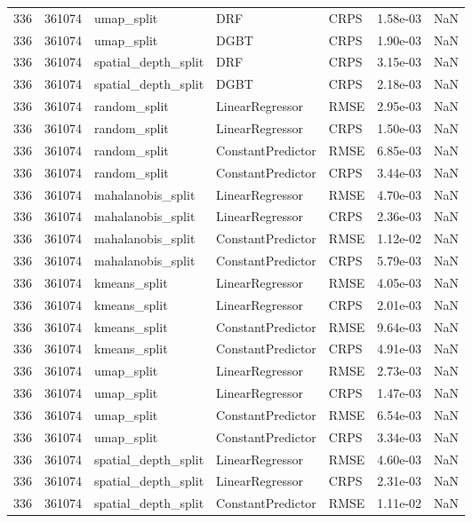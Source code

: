 \begin{tabular}{rrlllrr}
336 & 361074 & umap\_split & DRF & CRPS & 1.58e-03 & NaN \\
336 & 361074 & umap\_split & DGBT & CRPS & 1.90e-03 & NaN \\
336 & 361074 & spatial\_depth\_split & DRF & CRPS & 3.15e-03 & NaN \\
336 & 361074 & spatial\_depth\_split & DGBT & CRPS & 2.18e-03 & NaN \\
336 & 361074 & random\_split & LinearRegressor & RMSE & 2.95e-03 & NaN \\
336 & 361074 & random\_split & LinearRegressor & CRPS & 1.50e-03 & NaN \\
336 & 361074 & random\_split & ConstantPredictor & RMSE & 6.85e-03 & NaN \\
336 & 361074 & random\_split & ConstantPredictor & CRPS & 3.44e-03 & NaN \\
336 & 361074 & mahalanobis\_split & LinearRegressor & RMSE & 4.70e-03 & NaN \\
336 & 361074 & mahalanobis\_split & LinearRegressor & CRPS & 2.36e-03 & NaN \\
336 & 361074 & mahalanobis\_split & ConstantPredictor & RMSE & 1.12e-02 & NaN \\
336 & 361074 & mahalanobis\_split & ConstantPredictor & CRPS & 5.79e-03 & NaN \\
336 & 361074 & kmeans\_split & LinearRegressor & RMSE & 4.05e-03 & NaN \\
336 & 361074 & kmeans\_split & LinearRegressor & CRPS & 2.01e-03 & NaN \\
336 & 361074 & kmeans\_split & ConstantPredictor & RMSE & 9.64e-03 & NaN \\
336 & 361074 & kmeans\_split & ConstantPredictor & CRPS & 4.91e-03 & NaN \\
336 & 361074 & umap\_split & LinearRegressor & RMSE & 2.73e-03 & NaN \\
336 & 361074 & umap\_split & LinearRegressor & CRPS & 1.47e-03 & NaN \\
336 & 361074 & umap\_split & ConstantPredictor & RMSE & 6.54e-03 & NaN \\
336 & 361074 & umap\_split & ConstantPredictor & CRPS & 3.34e-03 & NaN \\
336 & 361074 & spatial\_depth\_split & LinearRegressor & RMSE & 4.60e-03 & NaN \\
336 & 361074 & spatial\_depth\_split & LinearRegressor & CRPS & 2.31e-03 & NaN \\
336 & 361074 & spatial\_depth\_split & ConstantPredictor & RMSE & 1.11e-02 & NaN \\

\end{tabular}
